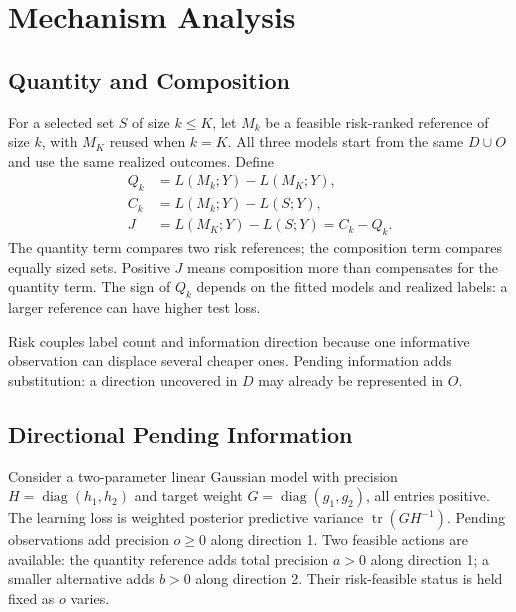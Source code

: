 \documentclass[runningheads]{llncs}
\begin{document}
\section{Mechanism Analysis}
\label{sec:mechanism}

\subsection{Quantity and Composition}
For a selected set $S$ of size $k\leq K$, let $M_k$ be a feasible risk-ranked reference of size $k$, with $M_K$ reused when $k=K$. All three models start from the same $D\cup O$ and use the same realized outcomes. Define
\begin{equation}
\begin{split}
 Q_k&=L(M_k;Y)-L(M_K;Y),\\
 C_k&=L(M_k;Y)-L(S;Y),\\
 J&=L(M_K;Y)-L(S;Y)=C_k-Q_k.
\end{split}\label{eq:decomposition}
\end{equation}
The quantity term compares two risk references; the composition term compares equally sized sets. Positive $J$ means composition more than compensates for the quantity term. The sign of $Q_k$ depends on the fitted models and realized labels: a larger reference can have higher test loss.

Risk couples label count and information direction because one informative observation can displace several cheaper ones. Pending information adds substitution: a direction uncovered in $D$ may already be represented in $O$.

\subsection{Directional Pending Information}
Consider a two-parameter linear Gaussian model with precision
$H=\operatorname{diag}(h_1,h_2)$ and target weight
$G=\operatorname{diag}(g_1,g_2)$, all entries positive. The learning loss is weighted posterior predictive variance $\operatorname{tr}(GH^{-1})$. Pending observations add precision $o\geq0$ along direction 1. Two feasible actions are available: the quantity reference adds total precision $a>0$ along direction 1; a smaller alternative adds $b>0$ along direction 2. Their risk-feasible status is held fixed as $o$ varies.
\end{document}
